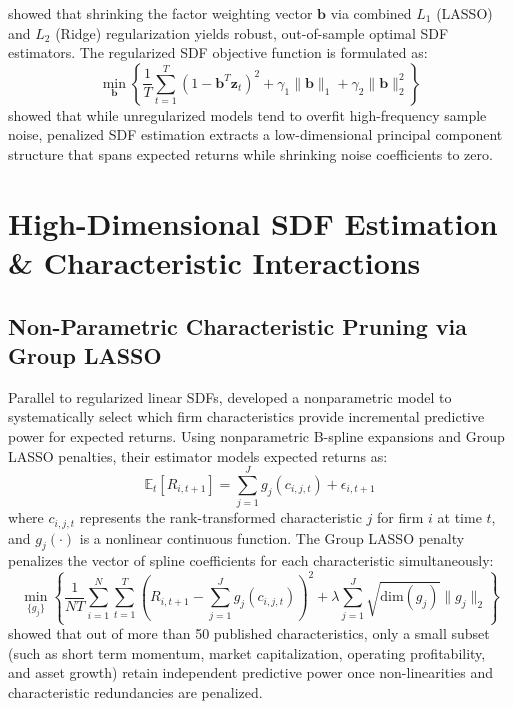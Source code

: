 \citet{kozak2020shrinking} showed that shrinking the factor weighting vector $\mathbf{b}$ via combined $L_1$ (LASSO) and $L_2$ (Ridge) regularization yields robust, out-of-sample optimal SDF estimators. The regularized SDF objective function is formulated as:
\begin{equation}
\min_{\mathbf{b}} \left\{ \frac{1}{T} \sum_{t=1}^{T} \left( 1 - \mathbf{b}^T \mathbf{z}_t \right)^2 + \gamma_1 \|\mathbf{b}\|_1 + \gamma_2 \|\mathbf{b}\|_2^2 \right\}
\label{eq:ch2_kozak_regularization}
\end{equation}
\citet{kozak2020shrinking} showed that while unregularized models tend to overfit high-frequency sample noise, penalized SDF estimation extracts a low-dimensional principal component structure that spans expected returns while shrinking noise coefficients to zero.

\section{High-Dimensional SDF Estimation \& Characteristic Interactions}

\subsection{Non-Parametric Characteristic Pruning via Group LASSO}
Parallel to regularized linear SDFs, \citet{freyberger2020dissecting} developed a nonparametric model to systematically select which firm characteristics provide incremental predictive power for expected returns. Using nonparametric B-spline expansions and Group LASSO penalties, their estimator models expected returns as:
\begin{equation}
\mathbb{E}_t[R_{i,t+1}] = \sum_{j=1}^{J} g_j(c_{i,j,t}) + \epsilon_{i,t+1}
\label{eq:ch2_freyberger_nonparametric}
\end{equation}
where $c_{i,j,t}$ represents the rank-transformed characteristic $j$ for firm $i$ at time $t$, and $g_j(\cdot)$ is a nonlinear continuous function. The Group LASSO penalty penalizes the vector of spline coefficients for each characteristic simultaneously:
\begin{equation}
\min_{\{g_j\}} \left\{ \frac{1}{NT} \sum_{i=1}^{N} \sum_{t=1}^{T} \left( R_{i,t+1} - \sum_{j=1}^{J} g_j(c_{i,j,t}) \right)^2 + \lambda \sum_{j=1}^{J} \sqrt{\text{dim}(g_j)} \|g_j\|_2 \right\}
\label{eq:ch2_group_lasso}
\end{equation}
\citet{freyberger2020dissecting} showed that out of more than 50 published characteristics, only a small subset (such as short term momentum, market capitalization, operating profitability, and asset growth) retain independent predictive power once non-linearities and characteristic redundancies are penalized.

